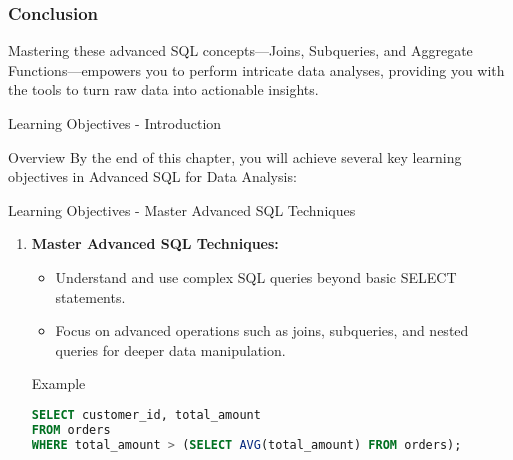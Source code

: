 \documentclass[aspectratio=169]{beamer}
\begin{document}
\begin{frame}[fragile]
    \frametitle{Conclusion}
    Mastering these advanced SQL concepts—Joins, Subqueries, and Aggregate Functions—empowers you to perform intricate data analyses, providing you with the tools to turn raw data into actionable insights.
\end{frame}

\begin{frame}[fragile]{Learning Objectives - Introduction}
    \begin{block}{Overview}
        By the end of this chapter, you will achieve several key learning objectives in Advanced SQL for Data Analysis:
    \end{block}
\end{frame}

\begin{frame}[fragile]{Learning Objectives - Master Advanced SQL Techniques}
    \begin{enumerate}
        \item \textbf{Master Advanced SQL Techniques:}
        \begin{itemize}
            \item Understand and use complex SQL queries beyond basic SELECT statements.
            \item Focus on advanced operations such as joins, subqueries, and nested queries for deeper data manipulation.
        \end{itemize}
        
        \begin{block}{Example}
        \begin{lstlisting}[language=sql]
SELECT customer_id, total_amount
FROM orders
WHERE total_amount > (SELECT AVG(total_amount) FROM orders);
        \end{lstlisting}
        \end{block}
    \end{enumerate}
\end{frame}
\end{document}
